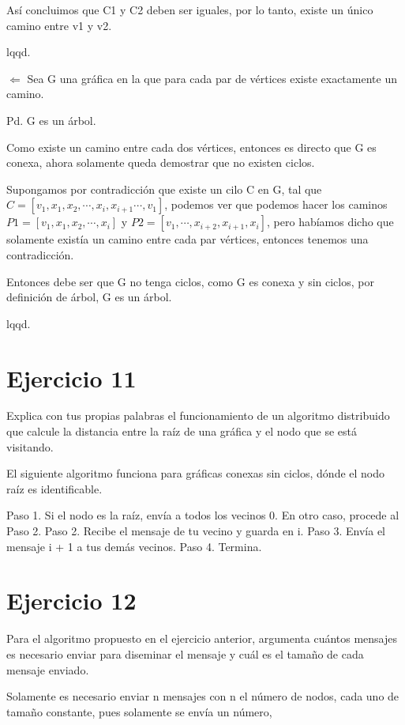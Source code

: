 \documentclass{article}
\begin{document}
Así concluimos que C1 y C2 deben ser iguales, por lo tanto, existe un único camino entre v1 y v2.

lqqd.

$\Leftarrow$ Sea G una gráfica en la que para cada par de vértices existe exactamente un camino.

Pd. G es un árbol.

Como existe un camino entre cada dos vértices, entonces es directo que G es conexa, ahora solamente queda demostrar que no existen ciclos.

Supongamos por contradicción que existe un cilo C en G, tal que $C=[v_1,x_1,x_2,\cdots,x_i,x_{i+1}\cdots,v_1]$, podemos ver que podemos hacer los caminos $P1=[v_1,x_1,x_2,\cdots,x_i]$ y $P2=[v_1,\cdots,x_{i+2},x_{i+1},x_i]$, pero habíamos dicho que solamente existía un camino entre cada par vértices, entonces tenemos una contradicción.

Entonces debe ser que G no tenga ciclos, como G es conexa y sin ciclos, por definición de árbol, G es un árbol.

lqqd.
\section*{Ejercicio 11}
Explica con tus propias palabras el funcionamiento de un algoritmo distribuido que calcule la distancia entre la raíz de una gráfica y el nodo que se está visitando.

El siguiente algoritmo funciona para gráficas conexas sin ciclos, dónde el nodo raíz es identificable.

Paso 1. Si el nodo es la raíz, envía a todos los vecinos 0. En otro caso, procede al Paso 2.
Paso 2. Recibe el mensaje de tu vecino y guarda en i. 
Paso 3. Envía el mensaje i + 1  a tus demás vecinos.
Paso 4. Termina.

\section*{Ejercicio 12}
Para el algoritmo propuesto en el ejercicio anterior, argumenta cuántos mensajes es necesario enviar para diseminar el mensaje y cuál es el tamaño de cada mensaje enviado.

Solamente es necesario enviar n mensajes con n el número de nodos, cada uno de tamaño constante, pues solamente se envía un número,
\end{document}
